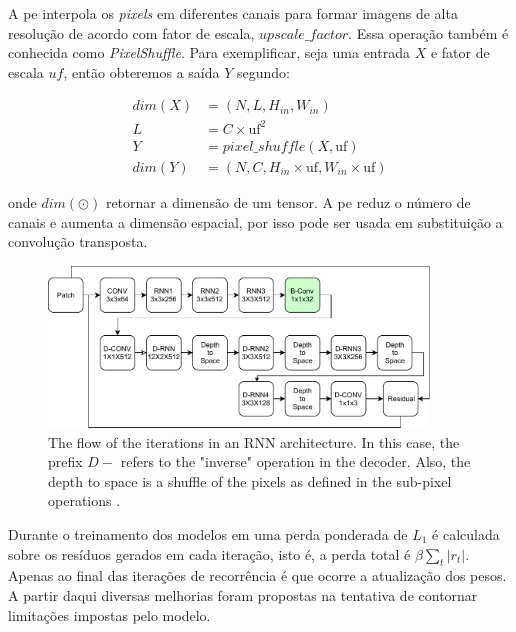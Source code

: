 A \acrshort{pe} interpola os \textit{pixels} em diferentes canais para formar imagens de alta resolução de acordo com fator de escala, $upscale\_factor$. Essa operação também é conhecida como \textit{PixelShuffle}. Para exemplificar, seja uma entrada $X$ e fator de escala $uf$, então obteremos a saída $Y$ segundo:   

\begin{equation}
\label{eq:pf}
\begin{aligned}
dim(X) &= (N,L,H_{in}, W_{in}) \\
L &=  C \times \text{uf}^2 \\ 
Y &= pixel\_shuffle(X, \text{uf}) \\
dim(Y) &= (N,C,H_{in} \times \text{uf}, W_{in}\times \text{uf}) 
\end{aligned}
\end{equation} 

onde $dim \left( \odot \right)$ retornar a dimensão de um tensor. A \acrshort{pe} reduz o número de canais e aumenta a dimensão espacial, por isso pode ser usada em substituição a convolução transposta.  

\begin{figure}[h]
	\centering
	\includegraphics[width=0.90\textwidth]{figuras/toderici_3.pdf}
	\caption{The flow of the iterations in an RNN architecture. In this case, the prefix $D-$ refers to the "inverse" operation in the decoder.   Also, the depth to space is a shuffle of the pixels as defined in the sub-pixel operations \cite{FullResolution2017Toderici}.}
	\label{fig:toderici3}
\end{figure}



Durante o treinamento dos modelos em \cite{FullResolution2017Toderici} uma perda ponderada de $L_1$ é calculada sobre os resíduos gerados em cada iteração, isto é, a perda total é $\beta \sum_t|r_t|$. Apenas ao final das iterações de recorrência é que ocorre a atualização dos pesos. A partir daqui diversas melhorias foram propostas na tentativa de contornar limitações impostas pelo modelo.


